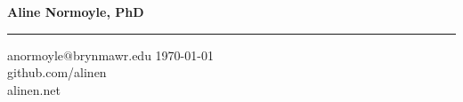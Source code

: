 {\Large {\bf Aline Normoyle, PhD}}
\hrule
anormoyle$@$brynmawr.edu \hfill \today \\
github.com/alinen\\
\textcolor{Periwinkle}{alinen.net}\\